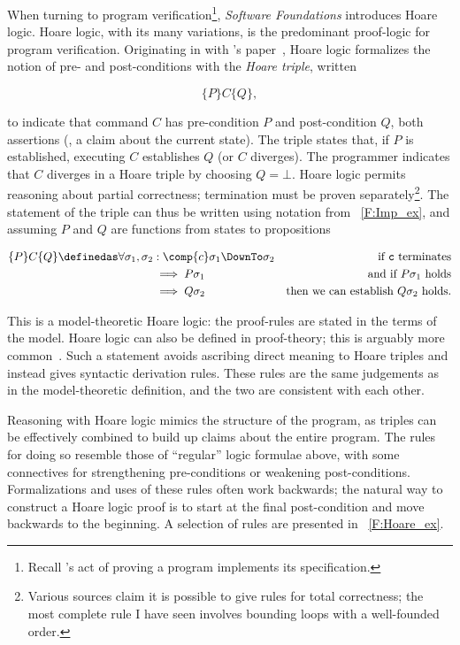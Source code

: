 When turning to program verification\footnote{Recall \citeauthor{EWD:EWD1036}'s
act of proving a program implements its specification.}, \emph{Software
Foundations} introduces Hoare logic. Hoare logic, with its many variations, is
the predominant proof-logic for program verification. Originating in
\citeyear{Hoare_1969} with \citeauthor{Hoare_1969}'s paper~\cite{Hoare_1969},
Hoare logic formalizes the notion of pre- and post-conditions with the
\emph{Hoare triple}, written

\begin{equation*}
    \{P\} C \{Q\},
\end{equation*}

to indicate that command \(C\) has pre-condition \(P\) and post-condition \(Q\),
both assertions (\eg, a claim about the current state). The triple states that,
if \(P\) is established, executing \(C\) establishes \(Q\) (or \(C\) diverges).
The programmer indicates that \(C\) diverges in a Hoare triple by choosing \(Q =
\bot\). Hoare logic permits reasoning about partial correctness; termination
must be proven separately\footnote{Various sources claim it is possible to give
rules for total correctness; the most complete rule I have seen involves
bounding loops with a well-founded order.}. The statement of the triple can thus
be written using notation from \figurename~\ref{F:Imp_ex}, and assuming \(P\)
and \(Q\) are functions from states to propositions

\begin{align*}
    \{P\} C \{Q\} \definedas \forall \sigma_1, \sigma_2 &: \comp{c}\sigma_1 \DownTo \sigma_2 &\text{if \(\mathtt{c}\) terminates} \\
    &\implies P \sigma_1 &\text{and if \(P \sigma_1\) holds} \\
    &\implies Q \sigma_2 &\text{then we can establish \(Q \sigma_2\) holds.}
\end{align*}

This is a model-theoretic Hoare logic: the proof-rules are stated in the terms
of the model. Hoare logic can also be defined in proof-theory; this is arguably
more common~\cite[Ch. \emph{Hoare Logic as a Logic}]{Pierce:SF2}. Such a
statement avoids ascribing direct meaning to Hoare triples and instead gives
syntactic derivation rules. These rules are the same judgements as in the
model-theoretic definition, and the two are consistent with each other.

Reasoning with Hoare logic mimics the structure of the program,
as triples can be effectively combined to build up claims about the entire
program. The rules for doing so resemble those of ``regular'' logic formulae
above, with some connectives for strengthening pre-conditions or weakening
post-conditions. Formalizations and uses of these rules often work backwards;
the natural way to construct a Hoare logic proof is to start at the final
post-condition and move backwards to the beginning. A selection of rules are
presented in \figurename~\ref{F:Hoare_ex}.

